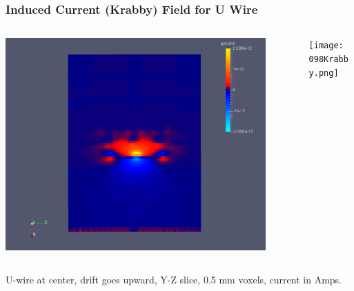 \documentclass[xcolor=dvipsnames]{beamer}
\begin{document}
\begin{frame}
  \frametitle{Induced Current (Krabby) Field for U Wire}
  \begin{columns}
    \begin{column}{0.8\textwidth}
      \includegraphics[width=0.9\textwidth]{demon-current.png}      
    \end{column}
    \begin{column}{0.2\textwidth}
      \texttt{[image: 098Krabby.png]}          
    \end{column}
  \end{columns}

  \begin{center}
  \footnotesize
  U-wire at center, drift goes upward, Y-Z slice, 0.5 mm voxels, current in Amps.
    
  \end{center}
\end{frame}
\end{document}
